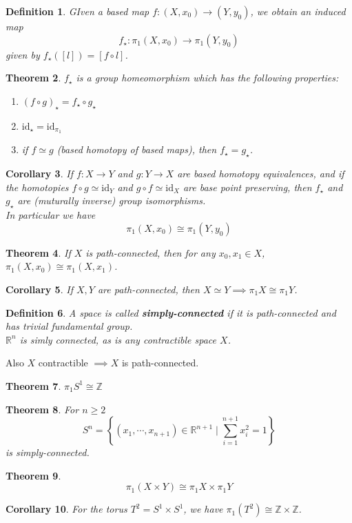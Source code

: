\documentclass{article}
\let\ddd\cdots
\newcommand{\R}{\mathbb{R}}
\newcommand{\Z}{\mathbb{Z}}
\newtheorem{theorem}{Theorem}[section]
\newtheorem{corollary}[theorem]{Corollary}
\newtheorem{definition}[theorem]{Definition}
\theoremstyle{remark}
\theoremstyle{example}
\theoremstyle{examples}
\begin{document}
	\begin{definition}
		GIven a based map $f:(X,x_0) \to (Y,y_0)$, we obtain an induced map
		\[f_\star : \pi_1(X,x_0)\to \pi_1(Y,y_0)\]
		given by $f_\star([l])=[f \circ l]$.
	\end{definition}

	\begin{theorem}
		$f_\star$ is a group homeomorphism which has the following properties:
		\begin{enumerate}
			\item $(f \circ g)_\star=f_\star \circ g_\star$
			\item $\mathrm{id}_\star=\mathrm{id}_{\pi_1}$
			\item if $f \simeq g$ (based homotopy of based maps),
			then $f_\star = g_\star$.
		\end{enumerate}
	\end{theorem}

	\begin{corollary}
		If $f:X \to Y$ and $g:Y \to X$ are based homotopy equivalences,
		and if the homotopies $f \circ g \simeq \mathrm{id}_Y$
		and $g \circ f \simeq \mathrm{id}_X$ are base point preserving,
		then $f_\star$ and $g_\star$ are (muturally inverse)
		group isomorphisms.\\
		In particular we have
		\[\pi_1(X,x_0) \cong \pi_1(Y,y_0)\]
	\end{corollary}

	\begin{theorem}
		If $X$ is path-connected, then for any $x_0,x_1 \in X$, $\pi_1(X,x_0)\cong \pi_1(X,x_1)$.
	\end{theorem}

	\begin{corollary}
		If $X,Y$ are path-connected, then $X \simeq Y \implies \pi_1 X \cong \pi_1 Y$.
	\end{corollary}

	\begin{definition}
		A space is called \textbf{simply-connected} if it is path-connected
		and has trivial fundamental group.\\
		$\R^n$ is simly connected, as is any contractible space $X$.
	\end{definition}

	Also $X$ contractible $\implies X$ is path-connected.

	\begin{theorem}
		$\pi_1 S^1 \cong \Z$
	\end{theorem}

	\begin{theorem}
		For $n \geq 2$
		\[S^n = \left\{ (x_1,\ddd, x_{n+1}) \in \R^{n+1} \mid \sum_{i=1}^{n+1} x_i^2 = 1 \right\}\]
		is simply-connected.
	\end{theorem}

	\begin{theorem}
		\[\pi_1(X \times Y) \cong \pi_1 X \times \pi_1 Y\]
	\end{theorem}

	\begin{corollary}
		For the torus $T^2=S^1 \times S^1$, we have $\pi_1(T^2)\cong \Z \times \Z$.
	\end{corollary}
\end{document}
